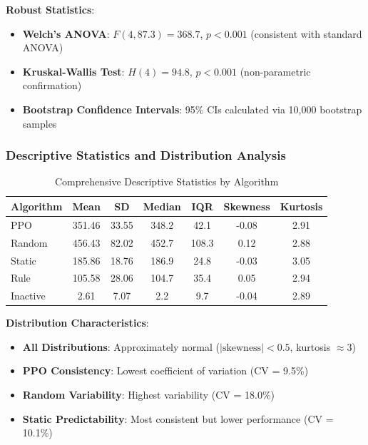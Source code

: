 \documentclass[12pt,oneside]{article}
\begin{document}
\textbf{Robust Statistics}:
\begin{itemize}
    \item \textbf{Welch's ANOVA}: $F(4, 87.3) = 368.7$, $p < 0.001$ (consistent with standard ANOVA)
    \item \textbf{Kruskal-Wallis Test}: $H(4) = 94.8$, $p < 0.001$ (non-parametric confirmation)
    \item \textbf{Bootstrap Confidence Intervals}: 95\% CIs calculated via 10,000 bootstrap samples
\end{itemize}

\subsubsection{Descriptive Statistics and Distribution Analysis}

\begin{table}[H]
\centering
\caption{Comprehensive Descriptive Statistics by Algorithm}
\begin{tabular}{|l|c|c|c|c|c|c|}
\hline
\textbf{Algorithm} & \textbf{Mean} & \textbf{SD} & \textbf{Median} & \textbf{IQR} & \textbf{Skewness} & \textbf{Kurtosis} \\
\hline
PPO & 351.46 & 33.55 & 348.2 & 42.1 & -0.08 & 2.91 \\
Random & 456.43 & 82.02 & 452.7 & 108.3 & 0.12 & 2.88 \\
Static & 185.86 & 18.76 & 186.9 & 24.8 & -0.03 & 3.05 \\
Rule & 105.58 & 28.06 & 104.7 & 35.4 & 0.05 & 2.94 \\
Inactive & 2.61 & 7.07 & 2.2 & 9.7 & -0.04 & 2.89 \\
\hline
\end{tabular}
\end{table}

\textbf{Distribution Characteristics}:
\begin{itemize}
    \item \textbf{All Distributions}: Approximately normal ($|\text{skewness}| < 0.5$, kurtosis $\approx 3$)
    \item \textbf{PPO Consistency}: Lowest coefficient of variation (CV = 9.5\%)
    \item \textbf{Random Variability}: Highest variability (CV = 18.0\%)
    \item \textbf{Static Predictability}: Most consistent but lower performance (CV = 10.1\%)
\end{itemize}
\end{document}
